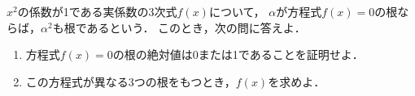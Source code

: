 \documentclass[../../main.tex]{subfiles}
\begin{document}
$x^2$の係数が1である実係数の3次式$f(x)$について，
$\alpha$が方程式$f(x)=0$の根ならば，$\alpha^2$も根であるという．
このとき，次の問に答えよ．
\begin{enumerate}
  \item 方程式$f(x)=0$の根の絶対値は0または1であることを証明せよ．
  \item この方程式が異なる3つの根をもつとき，$f(x)$を求めよ．
\end{enumerate}
\end{document}
